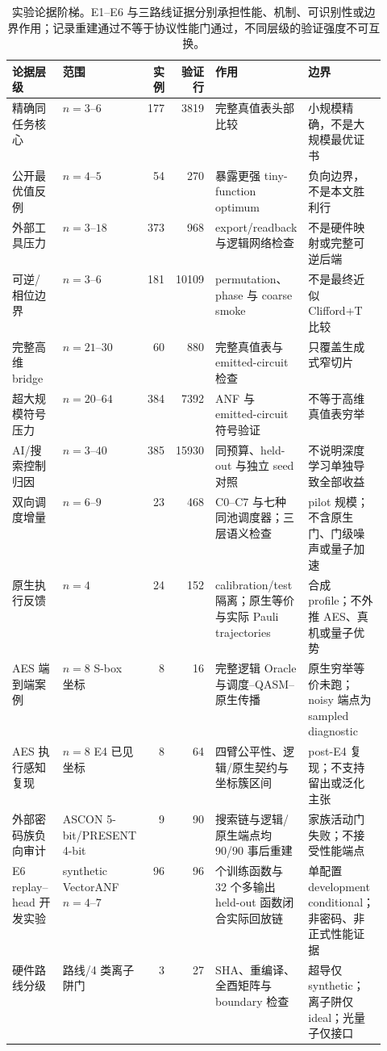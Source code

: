 \documentclass[UTF8,fontset=fandol,11pt]{ctexart}
\begin{document}
\begin{table}[H]
\centering
\tiny
\setlength{\tabcolsep}{2.1pt}
\renewcommand{\arraystretch}{1.04}
\caption{实验论据阶梯。E1--E6 与三路线证据分别承担性能、机制、可识别性或边界作用；记录重建通过不等于协议性能门通过，不同层级的验证强度不可互换。}
\label{tab:evidence-ladder-zh}
\begin{tabularx}{\linewidth}{>{\raggedright\arraybackslash}p{0.17\linewidth}>{\raggedright\arraybackslash}p{0.15\linewidth}rr>{\raggedright\arraybackslash}X>{\raggedright\arraybackslash}p{0.22\linewidth}}
\toprule
论据层级 & 范围 & 实例 & 验证行 & 作用 & 边界 \\
\midrule
精确同任务核心 & $n=3$--$6$ & 177 & 3819 & 完整真值表头部比较 & 小规模精确，不是大规模最优证书 \\
公开最优值反例 & $n=4$--$5$ & 54 & 270 & 暴露更强 tiny-function optimum & 负向边界，不是本文胜利行 \\
外部工具压力 & $n=3$--$18$ & 373 & 968 & export/readback 与逻辑网络检查 & 不是硬件映射或完整可逆后端 \\
可逆/相位边界 & $n=3$--$6$ & 181 & 10109 & permutation、phase 与 coarse smoke & 不是最终近似 Clifford+T 比较 \\
完整高维 bridge & $n=21$--$30$ & 60 & 880 & 完整真值表与 emitted-circuit 检查 & 只覆盖生成式窄切片 \\
超大规模符号压力 & $n=20$--$64$ & 384 & 7392 & ANF 与 emitted-circuit 符号验证 & 不等于高维真值表穷举 \\
AI/搜索控制归因 & $n=3$--$40$ & 385 & 15930 & 同预算、held-out 与独立 seed 对照 & 不说明深度学习单独导致全部收益 \\
双向调度增量 & $n=6$--$9$ & 23 & 468 & C0--C7 与七种同池调度器；三层语义检查 & pilot 规模；不含原生门、门级噪声或量子加速 \\
原生执行反馈 & $n=4$ & 24 & 152 & calibration/test 隔离；原生等价与实际 Pauli trajectories & 合成 profile；不外推 AES、真机或量子优势 \\
AES 端到端案例 & $n=8$ S-box 坐标 & 8 & 16 & 完整逻辑 Oracle 与调度--QASM--原生传播 & 原生穷举等价未跑；noisy 端点为 sampled diagnostic \\
AES 执行感知复现 & $n=8$ E4 已见坐标 & 8 & 64 & 四臂公平性、逻辑/原生契约与坐标簇区间 & post-E4 复现；不支持留出或泛化主张 \\
外部密码族负向审计 & ASCON 5-bit/PRESENT 4-bit & 9 & 90 & 搜索链与逻辑/原生端点均 90/90 事后重建 & 家族活动门失败；不接受性能端点 \\
E6 replay--head 开发实验 & synthetic VectorANF $n=4$--$7$ & 96 & 96 & 64 个训练函数与 32 个多输出 held-out 函数闭合实际回放链 & 单配置 development conditional；非密码、非正式性能证据 \\
硬件路线分级 & 3 路线/4 类离子阱门 & 3 & 27 & SHA、重编译、全酉矩阵与 boundary 检查 & 超导仅 synthetic；离子阱仅 ideal；光量子仅接口 \\
\bottomrule
\end{tabularx}
\end{table}
\end{document}
